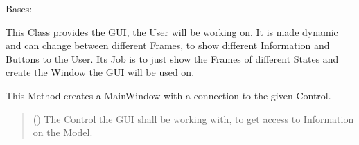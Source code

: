 \documentclass[letterpaper,10pt,english]{sphinxmanual}
\begin{document}
\begin{fulllineitems}
\label{\detokenize{apidoc/src.osm_configurator.view.states:src.osm_configurator.view.states.main_window.MainWindow}}
\pysigstartsignatures
{}
\pysigstopsignatures
\sphinxAtStartPar
Bases: 

\sphinxAtStartPar
This Class provides the GUI, the User will be working on.
It is made dynamic and can change between different Frames, to show different Information and Buttons to the User.
Its Job is to just show the Frames of different States and create the Window the GUI will be used on.

\begin{fulllineitems}
\label{\detokenize{apidoc/src.osm_configurator.view.states:src.osm_configurator.view.states.main_window.MainWindow.__init__}}
\pysigstartsignatures
{}
\pysigstopsignatures
\sphinxAtStartPar
This Method creates a MainWindow with a connection to the given Control.
\begin{quote}\begin{description}
\sphinxAtStartPar
{} ({\hyperref[\detokenize{apidoc/src.osm_configurator.control:src.osm_configurator.control.control_interface.IControl}]{}}) \textendash{} The Control the GUI shall be working with, to get access to Information on the Model.

\end{description}\end{quote}

\end{fulllineitems}



\end{fulllineitems}
\end{document}
